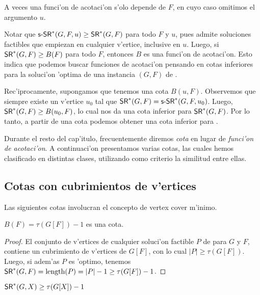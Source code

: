 \noindent
A veces una funci'on de acotaci'on s'olo depende de $F$, en cuyo caso omitimos el argumento $u$.

Notar que $\textnormal{\textsf{s-SR}}^*(G, F, u) \geq \textnormal{\textsf{SR}}^*(G, F)$ para todo $F$ y $u$, pues  admite soluciones factibles que empiezan en cualquier v'ertice, inclusive en $u$. Luego, si $\textnormal{\textsf{SR}}^*(G, F) \geq B(F)$ para todo $F$, entonces $B$ es una funci'on de acotaci'on. Esto indica que podemos buscar funciones de acotaci'on pensando en cotas inferiores para la soluci'on 'optima de una instancia $(G, F)$ de .

Rec'iprocamente, supongamos que tenemos una cota $B(u, F)$. Observemos que siempre existe un v'ertice $u_0$ tal que $\textnormal{\textsf{SR}}^*(G, F) = \textnormal{\textsf{s-SR}}^*(G, F, u_0)$. Luego, $\textnormal{\textsf{SR}}^*(G, F) \geq B(u_0, F)$, lo cual nos da una cota inferior para $\textnormal{\textsf{SR}}^*(G, F)$. Por lo tanto, a partir de una cota podemos obtener una cota inferior para .

Durante el resto del cap'itulo, frecuentemente diremos \textit{cota} en lugar de \textit{funci'on de acotaci'on}. A continuaci'on presentamos varias cotas, las cuales hemos clasificado en distintas clases, utilizando como criterio la similitud entre ellas.

\subsection{Cotas con cubrimientos de v'ertices}

Las siguientes cotas involucran el concepto de vertex cover m'inimo.

\begin{theorem}
\label{th:cota_vc}
$B(F) = \tau(G[F]) - 1$ es una cota.
\begin{proof}
El conjunto de v'ertices de cualquier soluci'on factible $P$ de  para $G$ y $F$, contiene un cubrimiento de v'ertices de $G[F]$, con lo cual $|P| \geq \tau(G[F])$. Luego, si adem'as $P$ es 'optimo, tenemos $\textnormal{\textsf{SR}}^*(G, F) = \textnormal{length}(P) = |P| - 1 \geq \tau(G[F]) - 1$.
\end{proof}
\end{theorem}

\begin{corollary}
\label{co:sr_tau}
$\textnormal{\textsf{SR}}^*(G, X) \geq \tau(G[X]) - 1$
\end{corollary}

